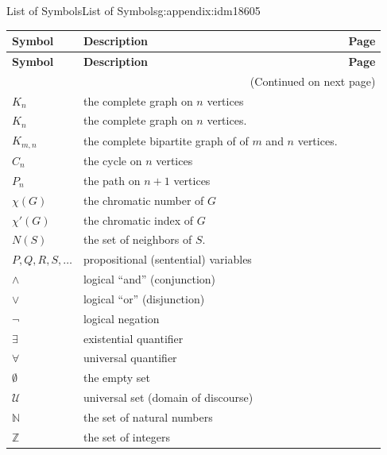 \documentclass[oneside,10pt,]{book}
\numberwithin{equation}{chapter}
\def\N{\mathbb N}
\def\Z{\mathbb Z}
\def\U{\mathcal U}
\begin{document}
\begin{appendixptx}{List of Symbols}{}{List of Symbols}{}{}{g:appendix:idm18605}
\begin{longtable}[l]{lp{}r}
\addtocounter{table}{-1}
\textbf{Symbol}&\textbf{Description}&\textbf{Page}\\[1em]
\endfirsthead
\textbf{Symbol}&\textbf{Description}&\textbf{Page}\\[1em]
\endhead
\multicolumn{3}{r}{(Continued on next page)}\\
\endfoot
\endlastfoot
\(K_n\)&the complete graph on \(n\) vertices&\pageref{g:notation:idm8967}\\
\(K_n\)&the complete graph on \(n\) vertices.&\pageref{g:notation:idm9020}\\
\(K_{m,n}\)&the complete bipartite graph of of \(m\) and \(n\) vertices.&\pageref{g:notation:idm9030}\\
\(C_n\)&the cycle on \(n\) vertices&\pageref{g:notation:idm9040}\\
\(P_n\)&the path on \(n+1\) vertices&\pageref{g:notation:idm9050}\\
\(\chi(G)\)&the chromatic number of \(G\)&\pageref{g:notation:idm10527}\\
\(\chi'(G)\)&the chromatic index of \(G\)&\pageref{g:notation:idm10916}\\
\(N(S)\)&the set of neighbors of \(S\).&\pageref{g:notation:idm11163}\\
\(
                    P, Q, R, S, \ldots
                \)&propositional (sentential) variables&\pageref{g:notation:idm12002}\\
\(\wedge\)&logical ``and'' (conjunction)&\pageref{g:notation:idm12025}\\
\(\vee\)&logical ``or'' (disjunction)&\pageref{g:notation:idm12040}\\
\(\neg\)&logical negation&\pageref{g:notation:idm12085}\\
\(\exists\)&existential quantifier&\pageref{g:notation:idm12555}\\
\(\forall\)&universal quantifier&\pageref{g:notation:idm12568}\\
\(\emptyset\)&the empty set&\pageref{g:notation:idm13007}\\
\(\U\)&universal set (domain of discourse)&\pageref{g:notation:idm13017}\\
\(\N\)&the set of natural numbers&\pageref{g:notation:idm13025}\\
\(\Z\)&the set of integers&\pageref{g:notation:idm13037}\\

\end{longtable}
\end{appendixptx}
\end{document}
